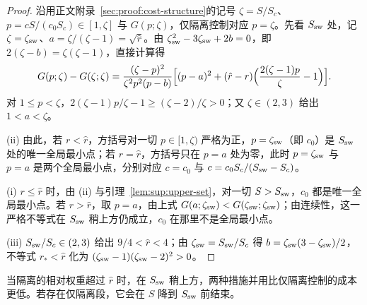 \begin{proof}
沿用正文附录~\ref{sec:proof:cost-structure}的记号 $\zeta=S/S_c$、$p=cS/(c_0S_c)\in[1,\zeta]$ 与 $G(p;\zeta)$，仅隔离控制对应 $p=\zeta$。先看 $S_{\rm sw}$ 处，记 $\zeta=\zeta_{\rm sw}$、$a=\zeta/(\zeta-1)=\sqrt{\hat r}$。由 $\zeta_{\rm sw}^2-3\zeta_{\rm sw}+2b=0$，即 $2(\zeta-b)=\zeta(\zeta-1)$，直接计算得
\[
G(p;\zeta)-G(\zeta;\zeta)=\frac{(\zeta-p)^2}{\zeta^2p^2(p-b)}\Bigl[(p-a)^2+(\hat r-r)\Bigl(\frac{2(\zeta-1)p}{\zeta}-1\Bigr)\Bigr].
\]
对 $1\le p<\zeta$，$2(\zeta-1)p/\zeta-1\ge(\zeta-2)/\zeta>0$；又 $\zeta\in(2,3)$ 给出 $1<a<\zeta$。

(ii) 由此，若 $r<\hat r$，方括号对一切 $p\in[1,\zeta)$ 严格为正，$p=\zeta_{\rm sw}$（即 $c_0$）是 $S_{\rm sw}$ 处的唯一全局最小点；若 $r=\hat r$，方括号只在 $p=a$ 处为零，此时 $p=\zeta_{\rm sw}$ 与 $p=a$ 是两个全局最小点，分别对应 $c=c_0$ 与 $c=c_0S_c/(S_{\rm sw}-S_c)$。

(i) $r\le\hat r$ 时，由 (ii) 与引理~\ref{lem:sup:upper-set}，对一切 $S>S_{\rm sw}$，$c_0$ 都是唯一全局最小点。若 $r>\hat r$，取 $p=a$，由上式 $G(a;\zeta_{\rm sw})<G(\zeta_{\rm sw};\zeta_{\rm sw})$；由连续性，这一严格不等式在 $S_{\rm sw}$ 稍上方仍成立，$c_0$ 在那里不是全局最小点。

(iii) $S_{\rm sw}/S_c\in(2,3)$ 给出 $9/4<\hat r<4$；由 $\zeta_{\rm sw}=S_{\rm sw}/S_c$ 得 $b=\zeta_{\rm sw}(3-\zeta_{\rm sw})/2$，不等式 $r_*<\hat r$ 化为 $(\zeta_{\rm sw}-1)(\zeta_{\rm sw}-2)^2>0$。
\end{proof}
当隔离的相对权重超过 $\hat r$ 时，在 $S_{\rm sw}$ 稍上方，两种措施并用比仅隔离控制的成本更低。若存在仅隔离段，它会在 $S$ 降到 $S_{\rm sw}$ 前结束。
